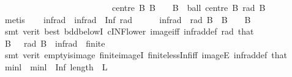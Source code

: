 \begin{isabellebody}
\ \ \ \ \ \ \ \ \ \ \ \ \ \ \ \ \ \ \ \ \ \ \ \ \ \ centre{\isacharcolon}{\kern0pt}\ {\isachardoublequoteopen}{\isasymAnd}B{\isachardot}{\kern0pt}\ B\ {\isasymin}\ {\isasymS}\ {\isasymLongrightarrow}\ B\ {\isacharequal}{\kern0pt}\ ball\ {\isacharparenleft}{\kern0pt}centre\ B{\isacharparenright}{\kern0pt}\ {\isacharparenleft}{\kern0pt}rad\ B{\isacharparenright}{\kern0pt}{\isachardoublequoteclose}\isanewline
\ \ \ \ \isamarkupfalse%
\ metis\isanewline
\ \ \isamarkupfalse%
\ infrad\ \ {\isachardoublequoteopen}infrad\ {\isasymequiv}\ Inf\ {\isacharparenleft}{\kern0pt}rad\ {\isacharbackquote}{\kern0pt}\ {\isasymS}{\isacharparenright}{\kern0pt}{\isachardoublequoteclose}\isanewline
\ \ \isamarkupfalse%
\ {\isachardoublequoteopen}infrad\ {\isasymle}\ rad\ B{\isachardoublequoteclose}\ \ {\isachardoublequoteopen}B\ {\isasymin}\ {\isasymS}{\isachardoublequoteclose}\ \ B\isanewline
\ \ \ \ \isamarkupfalse%
\ {\isacharparenleft}{\kern0pt}smt\ {\isacharparenleft}{\kern0pt}verit{\isacharcomma}{\kern0pt}\ best{\isacharparenright}{\kern0pt}\ bdd{\isacharunderscore}{\kern0pt}below{\isachardot}{\kern0pt}I\ cINF{\isacharunderscore}{\kern0pt}lower\ image{\isacharunderscore}{\kern0pt}iff\ infrad{\isacharunderscore}{\kern0pt}def\ rad\ that{\isacharparenright}{\kern0pt}\isanewline
\isanewline
\ \ \isamarkupfalse%
\ {\isachardoublequoteopen}{\isasymexists}B\ {\isasymin}\ {\isasymS}{\isachardot}{\kern0pt}\ rad\ B\ {\isacharequal}{\kern0pt}\ infrad{\isachardoublequoteclose}\ \ {\isachardoublequoteopen}finite\ {\isasymS}{\isachardoublequoteclose}\ {\isachardoublequoteopen}{\isasymS}\ {\isasymnoteq}\ {\isacharbraceleft}{\kern0pt}{\isacharbraceright}{\kern0pt}{\isachardoublequoteclose}\isanewline
\ \ \ \ \isamarkupfalse%
\ {\isacharparenleft}{\kern0pt}smt\ {\isacharparenleft}{\kern0pt}verit{\isacharparenright}{\kern0pt}\ empty{\isacharunderscore}{\kern0pt}is{\isacharunderscore}{\kern0pt}image\ finite{\isacharunderscore}{\kern0pt}imageI\ finite{\isacharunderscore}{\kern0pt}less{\isacharunderscore}{\kern0pt}Inf{\isacharunderscore}{\kern0pt}iff\ imageE\ infrad{\isacharunderscore}{\kern0pt}def\ that{\isacharparenright}{\kern0pt}\isanewline
\isanewline
\ \ \isamarkupfalse%
\ minl\ \ {\isachardoublequoteopen}minl\ {\isacharequal}{\kern0pt}\ Inf\ {\isacharparenleft}{\kern0pt}length\ {\isacharbackquote}{\kern0pt}\ L{\isacharparenright}{\kern0pt}{\isachardoublequoteclose}\isanewline

\end{isabellebody}

